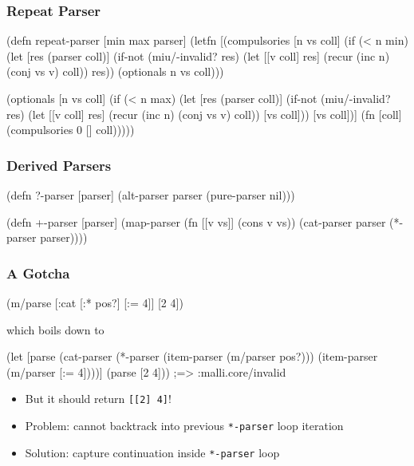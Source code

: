 \documentclass{beamer}
\begin{document}
\begin{frame}[fragile]
\frametitle{Repeat Parser}

{\scriptsize
\begin{semiverbatim}
(defn repeat-parser [min max parser]
  (letfn [(compulsories [n vs coll]
            (if (< n min)
              (let [res (parser coll)]
                (if-not (miu/-invalid? res)
                  (let [[v coll] res]
                    (recur (inc n) (conj vs v) coll))
                  res))
              (optionals n vs coll)))

          (optionals [n vs coll]
            (if (< n max)
              (let [res (parser coll)]
                (if-not (miu/-invalid? res)
                  (let [[v coll] res]
                    (recur (inc n) (conj vs v) coll))
                  [vs coll]))
              [vs coll])]
    (fn [coll] (compulsories 0 [] coll)))))
\end{semiverbatim}
}

\end{frame}


\begin{frame}[fragile]
\frametitle{Derived Parsers}

\begin{semiverbatim}
(defn ?-parser [parser]
  (alt-parser parser (pure-parser nil)))
\end{semiverbatim}

\begin{semiverbatim}
(defn +-parser [parser]
  (map-parser (fn [[v vs]] (cons v vs))
              (cat-parser parser (*-parser parser))))
\end{semiverbatim}

\end{frame}


\begin{frame}[fragile]
\frametitle{A Gotcha}

{\scriptsize
\begin{semiverbatim}
(m/parse [:cat [:* pos?] [:= 4]] [2 4])
\end{semiverbatim}

which boils down to

\begin{semiverbatim}
(let [parse (cat-parser (*-parser (item-parser (m/parser pos?)))
                        (item-parser (m/parser [:= 4])))]
  (parse [2 4])) ;=> :malli.core/invalid
\end{semiverbatim}
}

\begin{itemize}
\item But it should return \texttt{[[2] 4]}!
\item Problem: cannot backtrack into previous \texttt{*-parser} loop iteration
\item Solution: capture continuation inside \texttt{*-parser} loop
\end{itemize}

\end{frame}
\end{document}
